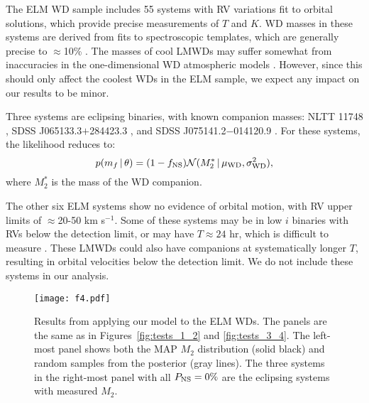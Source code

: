 \documentclass[apjl]{emulateapj}
\newcommand{\given}{\,|\,}
\newcommand{\Msun}{\ifmmode {{\rm M}_{\odot}}\else M$_{\odot}$\fi}
\newcommand{\period}{T}
\newcommand{\mf}{m_f}
\begin{document}
The ELM WD sample includes 55 systems with RV variations fit to orbital solutions, which provide precise measurements of $\period$ and $K$. WD masses in these systems are derived from fits to spectroscopic templates, which are generally precise to $\approx$10\% \citep{gianninas14}. The masses of cool LMWDs may suffer somewhat from inaccuracies in the one-dimensional WD atmospheric models \citep{tremblay13}. However, since this should only affect the coolest WDs in the ELM sample, we expect any impact on our results to be minor.

Three systems are eclipsing binaries, with known companion masses: NLTT 11748 \citep[$M_2=0.72~\Msun$;][]{kaplan14}, SDSS J065133.3$+$284423.3 \citep[$M_2=0.50~\Msun$;][]{brown11b}, and SDSS J075141.2$-$014120.9 \citep[$M_2=0.97~\Msun$;][]{kilic14}. For these systems, the likelihood reduces to:
\begin{equation}
p(\mf \given \theta) = (1-f_{\rm NS}) \mathcal{N}(M_2^* \given \mu_{\rm WD}, \sigma^2_{\rm WD}),
\end{equation}
where $M_2^*$ is the mass of the WD companion. 

The other six ELM systems show no evidence of orbital motion, with RV upper limits of $\approx$20-50 km s$^{-1}$. Some of these systems may be in low $i$ binaries with RVs below the detection limit, or may have $\period\approx24$ hr, which is difficult to measure \citep{ELMV}. These LMWDs could also have companions at systematically longer $\period$, resulting in orbital velocities below the detection limit. We do not include these systems in our analysis.

\begin{figure*}[h!]
\begin{center}
\texttt{[image: f4.pdf]}
\caption{Results from applying our model to the ELM WDs. 
The panels are the same as in Figures~\ref{fig:tests_1_2} and \ref{fig:tests_3_4}. 
The left-most panel shows both the MAP $M_2$ distribution (solid black) and random samples from the posterior (gray lines). 
The three systems in the right-most panel with all $P_{\rm NS} = 0\%$ are the eclipsing systems with measured $M_2$.
}
\label{fig:ELM_post}
\end{center}
\end{figure*}
\end{document}
